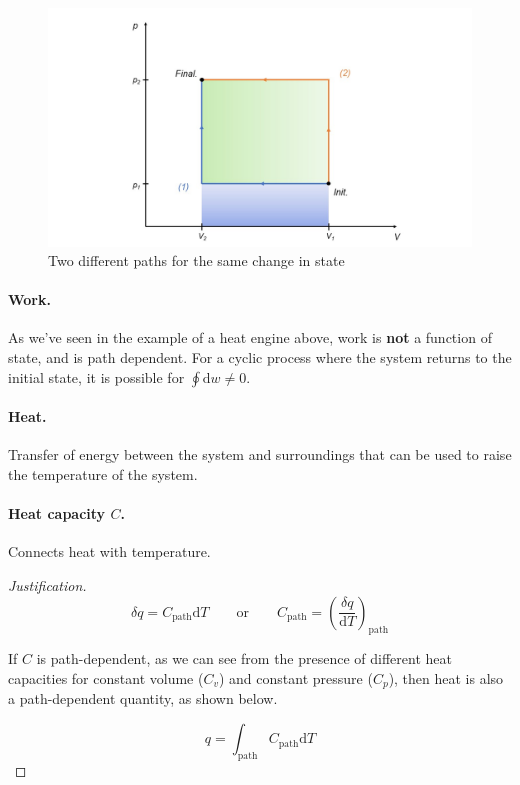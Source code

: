 \documentclass{article}
\numberwithin{theorem}{section}
\numberwithin{corollary}{section}
\numberwithin{postulate}{section}
\numberwithin{lemma}{section}
\numberwithin{definition}{section}
\newenvironment{justification} {\begin{proof}[Justification]} {\end{proof}}
\begin{document}
\begin{figure}[h]
\caption{Two different paths for the same change in state}
\centering
\includegraphics[width=1.0\textwidth]{fig1.jpg}
\end{figure}



\paragraph{Work. }As we've seen in the example of a heat engine above, work is \textbf{not} a
function of state, and is path dependent. For a cyclic process where the system returns to the initial state, it is
possible for $\oint \mathrm{d} w \neq 0$.

\paragraph{Heat. }Transfer of energy between the system and surroundings that
can be used to raise the temperature of the system.

\paragraph{Heat capacity $C$. }Connects heat with temperature. 

\begin{justification}

  \begin{equation}
    \delta q = C_\mathrm{path} \mathrm{d}T \qquad \mathrm{or} \qquad C_\mathrm{path} = \left( \frac{\delta q}{\mathrm{d} T} \right)_\mathrm{path}
  \end{equation}

  If $C$ is path-dependent, as we can see from the presence of different heat capacities for
  constant volume ($C_v$) and constant pressure ($C_p$), then heat is also a
  path-dependent quantity, as shown below.

  \begin{equation*}
    q = \int_\mathrm{path} C_\mathrm{path} \mathrm{d} T
  \end{equation*}

\end{justification}
\end{document}
